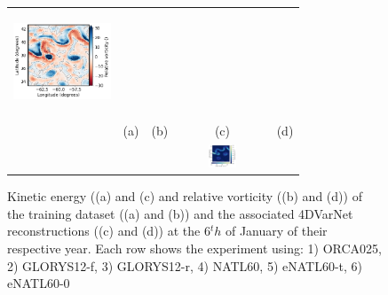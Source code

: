 \documentclass[draft]{agujournal2019}
\begin{document}
\begin{figure}[H]
\begin{center}
\begin{tabular}{ccccc}
 \includegraphics[trim={18mm 0 26mm 5mm},clip,width=2.9cm,height=3.1cm]{figures/plots2/enatl60-0_rec_vort_r.png} \\
 \hspace{-15mm} &(a) & (b) & (c) & (d) \\
 &&
&\hspace{-30mm} \includegraphics[trim={8mm 0 22mm 7cm},clip,width=2.5cm,height=0.7cm]{figures/plots/horizontal_cbar_ke_bottom.png} &\\

\end{tabular}
\vspace{-3mm}
\caption{
Kinetic energy ((a) and (c) and relative vorticity ((b) and (d)) of the training dataset ((a) and (b)) and the associated 4DVarNet reconstructions ((c) and (d)) at the 6$^th$ of January of their respective year.
Each row shows the experiment using: 1) ORCA025, 2) GLORYS12-f, 3) GLORYS12-r, 4) NATL60, 5) eNATL60-t, 6) eNATL60-0}
\vspace{-5mm}
\label{fig:maps}
\end{center}
\end{figure}
\end{document}
